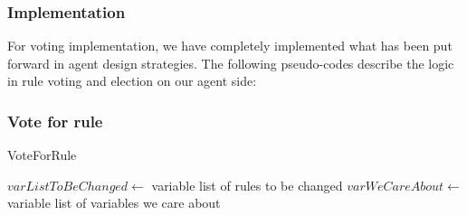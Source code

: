 \subsubsection{Implementation} \label{subsubsec:Team6_Voting:Implementation}
For voting implementation, we have completely implemented what has been put forward in agent design strategies. The following pseudo-codes describe the logic in rule voting and election on our agent side:
\subsubsection{Vote for rule}
\begin{algorithm}[H]
    \caption{VoteForRule} 
        $varListToBeChanged \gets$ variable list of rules to be changed\;
        $varWeCareAbout \gets$ variable list of variables we care about\;
    \end{algorithm}

